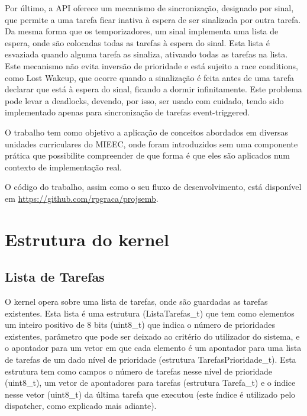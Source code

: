 \documentclass[journal]{IEEEtran}
\begin{document}
Por último, a API oferece um mecanismo de sincronização, designado por sinal, que permite a uma tarefa ficar inativa à espera de ser sinalizada por outra tarefa.
Da mesma forma que os temporizadores, um sinal implementa uma lista de espera, onde são colocadas todas as tarefas à espera do sinal.
Esta lista é esvaziada quando alguma tarefa as sinaliza, ativando todas as tarefas na lista.
Este mecanismo não evita inversão de prioridade e está sujeito a race conditions, como Lost Wakeup, que ocorre quando a sinalização é feita antes de uma tarefa declarar
que está à espera do sinal, ficando a dormir infinitamente.
Este problema pode levar a deadlocks, devendo, por isso, ser usado com cuidado, tendo sido implementado apenas para sincronização de tarefas event-triggered.


O trabalho tem como objetivo a aplicação de conceitos abordados em diversas unidades curriculares do MIEEC, onde foram introduzidos sem uma componente prática que
possibilite compreender de que forma é que eles são aplicados num contexto de implementação real.

O código do trabalho, assim como o seu fluxo de desenvolvimento, está disponível em \url{https://github.com/rpgraca/projsemb}.

\section{Estrutura do kernel}

\subsection{Lista de Tarefas}
O kernel opera sobre uma lista de tarefas, onde são guardadas as tarefas existentes.
Esta lista é uma estrutura (ListaTarefas\_t) que tem como elementos um inteiro positivo de 8 bits (uint8\_t) que indica o número de prioridades existentes, parâmetro que pode ser deixado ao
critério do utilizador do sistema, e o apontador para um vetor em que cada elemento é um apontador para uma lista de tarefas de um dado nível de prioridade (estrutura
TarefasPrioridade\_t).
Esta estrutura tem como campos o número de tarefas nesse nível de prioridade (uint8\_t), um vetor de apontadores para tarefas (estrutura Tarefa\_t) e o índice nesse vetor
(uint8\_t) da última
tarefa que executou (este índice é utilizado pelo dispatcher, como explicado mais adiante).
\end{document}
